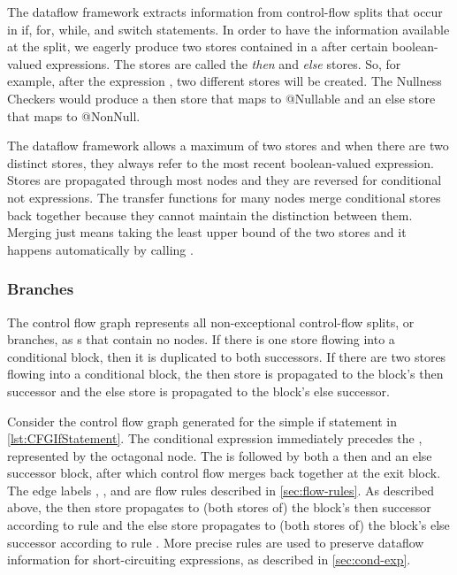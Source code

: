 The dataflow framework extracts information from control-flow splits that occur in if, for, while, and switch statements.  In order to have the information available at the split, we eagerly produce two stores contained in a  after certain boolean-valued expressions.  The stores are called the \emph{then} and \emph{else} stores.  So, for example, after the expression , two different stores will be created.  The Nullness Checkers would produce a then store that maps  to @Nullable and an else store that maps  to @NonNull.

The dataflow framework allows a maximum of two stores and when there are two distinct stores, they always refer to the most recent boolean-valued expression.  Stores are propagated through most nodes and they are reversed for conditional not expressions.  The transfer functions for many nodes merge conditional stores back together because they cannot maintain the distinction between them.  Merging just means taking the least upper bound of the two stores and it happens automatically by
calling .


\subsubsection{Branches}

The control flow graph represents all non-exceptional control-flow splits, or branches, as s that contain no nodes.  If there is one store flowing into a conditional block, then it is duplicated to both successors.  If there are two stores flowing into a conditional block, the then store is propagated to the block's then successor and the else store is propagated to the block's else successor.

Consider the control flow graph generated for the simple if statement in \autoref{lst:CFGIfStatement}.  The conditional expression  immediately precedes the , represented by the octagonal node.  The  is followed by both a then and an else successor block, after which control flow merges back together at the exit block.  The edge labels , , and  are flow rules described in \autoref{sec:flow-rules}.  As described above, the then store propagates to (both stores of) the block's then successor according to rule  and the else store propagates to (both stores of) the block's else successor according to rule .  More precise rules are used to preserve dataflow information for short-circuiting expressions, as described in \autoref{sec:cond-exp}.

